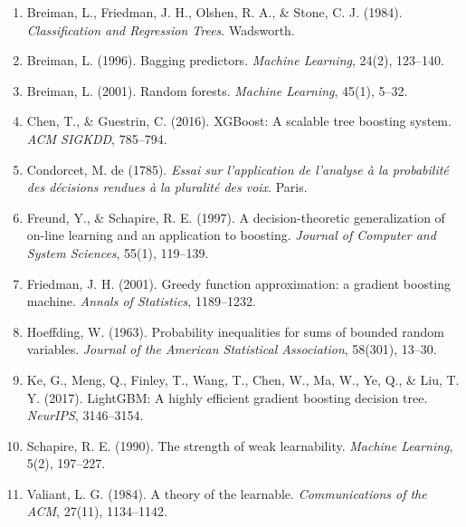\documentclass[11pt,a4paper]{article}
\begin{document}
\begin{enumerate}
    \item Breiman, L., Friedman, J. H., Olshen, R. A., \& Stone, C. J. (1984). \emph{Classification and Regression Trees}. Wadsworth.
    \item Breiman, L. (1996). Bagging predictors. \emph{Machine Learning}, 24(2), 123--140.
    \item Breiman, L. (2001). Random forests. \emph{Machine Learning}, 45(1), 5--32.
    \item Chen, T., \& Guestrin, C. (2016). XGBoost: A scalable tree boosting system. \emph{ACM SIGKDD}, 785--794.
    \item Condorcet, M. de (1785). \emph{Essai sur l'application de l'analyse \`a la probabilit\'e des d\'ecisions rendues \`a la pluralit\'e des voix}. Paris.
    \item Freund, Y., \& Schapire, R. E. (1997). A decision-theoretic generalization of on-line learning and an application to boosting. \emph{Journal of Computer and System Sciences}, 55(1), 119--139.
    \item Friedman, J. H. (2001). Greedy function approximation: a gradient boosting machine. \emph{Annals of Statistics}, 1189--1232.
    \item Hoeffding, W. (1963). Probability inequalities for sums of bounded random variables. \emph{Journal of the American Statistical Association}, 58(301), 13--30.
    \item Ke, G., Meng, Q., Finley, T., Wang, T., Chen, W., Ma, W., Ye, Q., \& Liu, T. Y. (2017). LightGBM: A highly efficient gradient boosting decision tree. \emph{NeurIPS}, 3146--3154.
    \item Schapire, R. E. (1990). The strength of weak learnability. \emph{Machine Learning}, 5(2), 197--227.
    \item Valiant, L. G. (1984). A theory of the learnable. \emph{Communications of the ACM}, 27(11), 1134--1142.
\end{enumerate}
\end{document}
